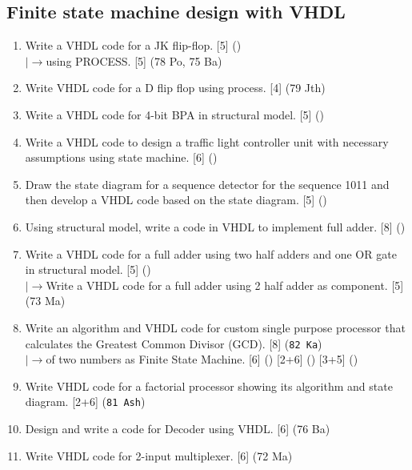 \documentclass[12pt]{article}
\newcommand{\lb}{\\$\left|\rightarrow\right.$}
\begin{document}
  \subsection{Finite state machine design with VHDL}
    \begin{enumerate}
      \item Write a VHDL code for a JK flip-flop. \hfill [5] ()
      \lb using PROCESS. \hfill [5] (78 Po, 75 Ba)

    \item Write VHDL code for a D flip flop using process. \hfill [4] (79 Jth)

      \item Write a VHDL code for 4-bit BPA in structural model. \hfill [5] ()

      \item Write a VHDL code to design a traffic light controller unit with necessary assumptions using state machine. \hfill [6] ()

      \item Draw the state diagram for a sequence detector for the sequence 1011 and then develop a VHDL code based on the state diagram. \hfill [5] ()

      \item Using structural model, write a code in VHDL to implement full adder. \hfill [8] ()

      \item Write a VHDL code for a full adder using two half adders and one OR gate in structural model. \hfill [5] ()
      \lb Write a VHDL code for a full adder using 2 half adder as component. \hfill [5] (73 Ma)

      \item Write an algorithm and VHDL code for custom single purpose processor that calculates the Greatest Common Divisor (GCD). \hfill [8] (\texttt{82 Ka})
        \lb of two numbers as Finite State Machine. \hfill [6] () [2+6] () [3+5] ()

      \item Write VHDL code for a factorial processor showing its algorithm and state diagram. \hfill [2+6] (\texttt{81 Ash})

      \item Design and write a code for Decoder using VHDL. \hfill [6] (76 Ba)
      
      \item Write VHDL code for 2-input multiplexer. \hfill [6] (72 Ma)


\end{enumerate}
\end{document}
